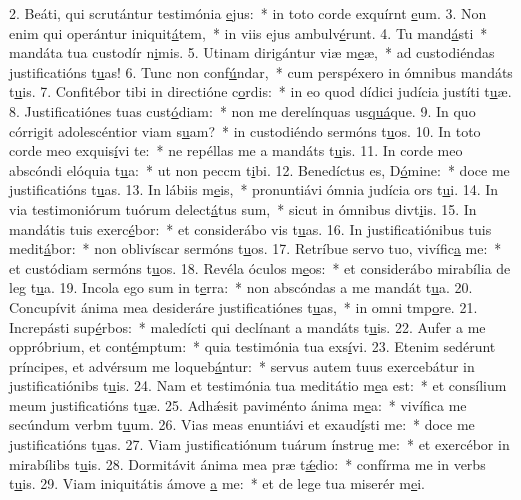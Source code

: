 2. Beáti, qui scrutántur testimónia \uline{e}jus:~* in toto corde exquírnt \uline{e}um.
3. Non enim qui operántur iniquit\uline{á}tem,~* in viis ejus ambulv\uline{é}runt.
4. Tu mand\uline{á}sti~* mandáta tua custodír n\uline{i}mis.
5. Utinam dirigántur viæ m\uline{e}æ,~* ad custodiéndas justificatións t\uline{u}as!
6. Tunc non conf\uline{ú}ndar,~* cum perspéxero in ómnibus mandáts t\uline{u}is.
7. Confitébor tibi in directióne c\uline{o}rdis:~* in eo quod dídici judícia justíti t\uline{u}æ.
8. Justificatiónes tuas cust\uline{ó}diam:~* non me derelínquas us\uline{quá}que.
9. In quo córrigit adolescéntior viam s\uline{u}am?~* in custodiéndo sermóns t\uline{u}os.
10. In toto corde meo exquis\uline{í}vi te:~* ne repéllas me a mandáts t\uline{u}is.
11. In corde meo abscóndi elóquia t\uline{u}a:~* ut non peccm t\uline{i}bi.
12. Benedíctus es, D\uline{ó}mine:~* doce me justificatións t\uline{u}as.
13. In lábiis m\uline{e}is,~* pronuntiávi ómnia judícia ors t\uline{u}i.
14. In via testimoniórum tuórum delect\uline{á}tus sum,~* sicut in ómnibus divt\uline{i}is.
15. In mandátis tuis exerc\uline{é}bor:~* et considerábo vis t\uline{u}as.
16. In justificatiónibus tuis medit\uline{á}bor:~* non oblivíscar sermóns t\uline{u}os.
17. Retríbue servo tuo, vivífic\uline{a} me:~* et custódiam sermóns t\uline{u}os.
18. Revéla óculos m\uline{e}os:~* et considerábo mirabília de leg t\uline{u}a.
19. Incola ego sum in t\uline{e}rra:~* non abscóndas a me mandát t\uline{u}a.
20. Concupívit ánima mea desideráre justificatiónes t\uline{u}as,~* in omni tmp\uline{o}re.
21. Increpásti sup\uline{é}rbos:~* maledícti qui declínant a mandáts t\uline{u}is.
22. Aufer a me oppróbrium, et cont\uline{é}mptum:~* quia testimónia tua exs\uline{í}vi.
23. Etenim sedérunt príncipes, et advérsum me loqueb\uline{á}ntur:~* servus autem tuus exercebátur in justificatiónibs t\uline{u}is.
24. Nam et testimónia tua meditátio m\uline{e}a est:~* et consílium meum justificatións t\uline{u}æ.
25. Adhǽsit paviménto ánima m\uline{e}a:~* vivífica me secúndum verbm t\uline{u}um.
26. Vias meas enuntiávi et exaud\uline{í}sti me:~* doce me justificatións t\uline{u}as.
27. Viam justificatiónum tuárum ínstru\uline{e} me:~* et exercébor in mirabílibs t\uline{u}is.
28. Dormitávit ánima mea præ t\uline{ǽ}dio:~* confírma me in verbs t\uline{u}is.
29. Viam iniquitátis ámove \uline{a} me:~* et de lege tua miserér m\uline{e}i.

